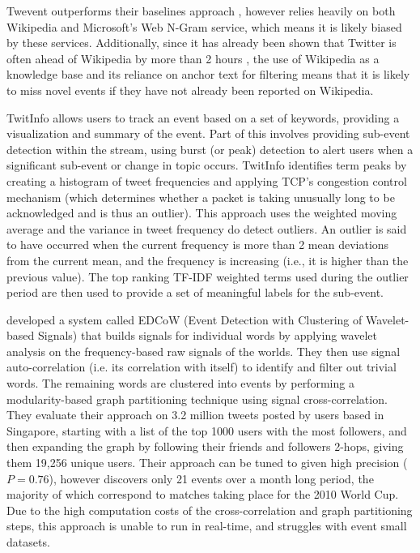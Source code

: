 Twevent outperforms their baselines approach \citep{weng2011event}, however relies heavily on both Wikipedia and Microsoft's Web N-Gram service, which means it is likely biased by these services.
Additionally, since it has already been shown that Twitter is often ahead of Wikipedia by more than 2 hours \citep{WRN2012:osbornebieber}, the use of Wikipedia as a knowledge base and its reliance on anchor text for filtering means that it is likely to miss novel events if they have not already been reported on Wikipedia.

TwitInfo \citep{marcus2011twitinfo} allows users to track an event based on a set of keywords, providing a visualization and summary of the event.
Part of this involves providing sub-event detection within the stream, using burst (or peak) detection to alert users when a significant sub-event or change in topic occurs.
TwitInfo identifies term peaks by creating a histogram of tweet frequencies
and applying TCP's congestion control mechanism (which determines whether a packet is taking unusually long to be acknowledged and is thus an outlier).
This approach uses the weighted moving average and the variance in tweet frequency do detect outliers.
An outlier is said to have occurred when the current frequency is more than 2 mean deviations from the current mean, and the frequency is increasing (i.e., it is higher than the previous value).
The top ranking TF-IDF weighted terms used during the outlier period are then used to provide a set of meaningful labels for the sub-event.

\cite{weng2011event} developed a system called EDCoW (Event Detection with Clustering of Wavelet-based Signals) that builds signals for individual words by applying wavelet analysis on the frequency-based raw signals of the worlds.
They then use signal auto-correlation (i.e. its correlation with itself) to identify and filter out trivial words.
The remaining words are clustered into events by performing a modularity-based graph partitioning technique using signal cross-correlation.
They evaluate their approach on 3.2 million tweets posted by users based in Singapore, starting with a list of the top 1000 users with the most followers, and then expanding the graph by following their friends and followers 2-hops, giving them 19,256 unique users.
Their approach can be tuned to given high precision ($P = 0.76$), however discovers only 21 events over a month long period, the majority of which correspond to matches taking place for the 2010 World Cup.
Due to the high computation costs of the cross-correlation and graph partitioning steps, this approach is unable to run in real-time, and struggles with event small datasets.

